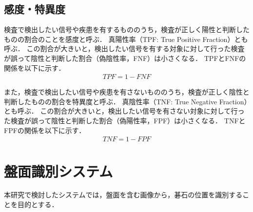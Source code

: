 \documentclass[openright]{nitocs}
\numberwithin{equation}{section}
\begin{document}
        \subsection{感度・特異度} %
        検査で検出したい信号や疾患を有するもののうち，検査が正しく陽性と判断したものの割合のことを感度と呼ぶ．
        真陽性率（TPF: True Positive Fraction）とも呼ぶ．
        この割合が大きいと，検出したい信号を有する対象に対して行った検査が誤って陰性と判断した割合（偽陰性率，FNF）は小さくなる．
        TPFとFNFの関係を以下に示す．
        \begin{align}
            TPF = 1-FNF
        \end{align}

        また，検査で検出したい信号や疾患を有さないもののうち，検査が正しく陰性と判断したものの割合を特異度と呼ぶ．
        真陰性率（TNF: True Negative Fraction）とも呼ぶ．
        この割合が大きいと，検出したい信号を有さない対象に対して行った検査が誤って陰性と判断した割合（偽陽性率，FPF）は小さくなる．
        TNFとFPFの関係を以下に示す．
        \begin{align}
            TNF = 1-FPF
        \end{align}


    \section{盤面識別システム} %
    \label{system}
        本研究で検討したシステムでは，盤面を含む画像から，碁石の位置を識別することを目的とする．
\end{document}

